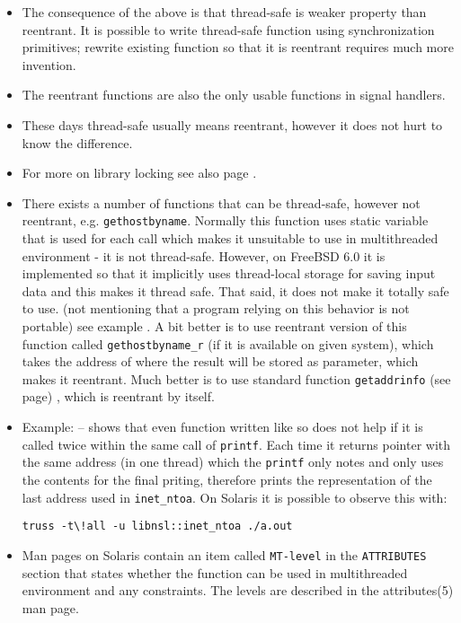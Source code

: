 \begin{itemize}
\item The consequence of the above is that thread-safe is weaker property
than reentrant. It is possible to write thread-safe function using
synchronization primitives; rewrite existing function so that it is reentrant
requires much more invention.
\item The reentrant functions are also the only usable functions in
signal handlers.
\item These days thread-safe usually means reentrant, however it does not
hurt to know the difference.
\item For more on library locking see also page \pageref{MUTEXES2}.
\item There exists a number of functions that can be thread-safe, however
not reentrant, e.g. \texttt{gethostbyname}. Normally this function uses
static variable that is used for each call which makes it unsuitable to use
in multithreaded environment - it is not thread-safe.
However, on FreeBSD 6.0 it is implemented so that it implicitly uses
thread-local storage for saving input data and this makes it
thread safe. That said, it does not make it totally safe to use.
(not mentioning that a program relying on this behavior is not portable)
see example .
A bit better is to use reentrant version of this function called 
\texttt{gethostbyname\_r} (if it is available on given system),
which takes the address of where the result will be stored as parameter,
which makes it reentrant. Much better is to use standard function
\texttt{getaddrinfo} (see page) \pageref{GETADDRINFO}, which is reentrant
by itself.

\item Example:  -- shows that even
function written like so does not help if it is called twice within
the same call of \texttt{printf}. Each time it returns pointer with
the same address (in one thread) which the \texttt{printf} only notes
and only uses the contents for the final priting, therefore prints
the representation of the last address used in \texttt{inet\_ntoa}.
On Solaris it is possible to observe this with:
\begin{verbatim}
truss -t\!all -u libnsl::inet_ntoa ./a.out
\end{verbatim}
\item Man pages on Solaris contain an item called
\texttt{MT-level} in the \texttt{ATTRIBUTES} section that states
whether the function can be used in multithreaded environment and
any constraints. The levels are described in the attributes(5) man page.
\end{itemize}

